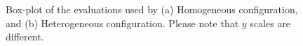 \documentclass[conference]{IEEEtran}
\begin{document}
\begin{figure}[t]
    \centering
      \caption{Box-plot of the
        evaluations used by (a) Homogeneous configuration, and (b)
        Heterogeneous configuration. Please note that $y$ scales are different.}
    \label{fig:griewank-evals}
\end{figure}
%
\end{document}
